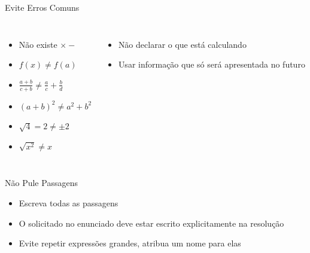 \documentclass[fleqn,utf8,aspectratio=169,12pt]{beamer}
\begin{document}
\begin{frame}{Evite Erros Comuns}
\begin{columns}[t]
  \begin{itemize}[<+->]
    \setlength\itemsep{1.2em}
    \item Não existe $\times-$
    \item \(f(x) \neq f(a)\)
    \item \(\frac{a+b}{c+b} \neq \frac{a}{c}+\frac{b}{d}\)
    \item \((a+b)^2 \neq a^2 + b^2\)
    \item \(\sqrt{4} = 2 \neq \pm 2 \)
    \item \(\sqrt{x^2} \neq x\)
  \end{itemize}
  \begin{itemize}[<+->]
    \setlength\itemsep{1em}
    \item Não declarar o que está calculando
    \item Usar informação que só será apresentada no futuro
  \end{itemize}
\end{columns}
\end{frame}

\begin{frame}{Não Pule Passagens}
  \begin{itemize}[<+->]
    \item Escreva todas as passagens
    \item O solicitado no enunciado deve estar escrito explicitamente na resolução
    \item Evite repetir expressões grandes, atribua um nome para elas
  \end{itemize}
\end{frame}
\end{document}
